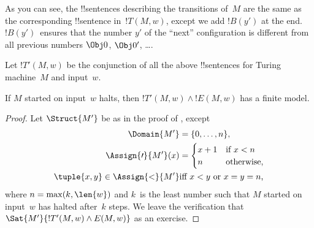 \documentclass[../../../include/open-logic-section]{subfiles}
\begin{document}
\begin{enumerate}
As you can see, the !!{sentence}s describing the transitions of~$M$ 
are the same as the corresponding !!{sentence}
in~$!T(M,w)$, except we add $!B(y')$ at the end. $!B(y')$~ensures
that the number $y'$ of the ``next'' configuration is different from
all previous numbers $\Obj 0$, $\Obj 0'$, \dots.
\end{enumerate}
Let $!T'(M, w)$ be the conjunction of all the above !!{sentence}s for Turing
machine~$M$ and input~$w$.

\begin{lem}
  If $M$ started on input~$w$ halts, then $!T'(M,w) \land !E(M,w)$ has
  a finite model.
\end{lem}

\begin{proof}
  Let $\Struct{M'}$ be as in the proof of
  , except
  \begin{align*}
    \Domain{M'} & = \{0, \dots, n\},\\
    \Assign{\prime}{M'}(x) & = 
    \begin{cases}
      x + 1 &\text{if $x < n$}\\
      n &\text{otherwise,}
    \end{cases} \\
    \tuple{x,y} \in \Assign{<}{M'} &\text{iff $x < y$ or $x = y = n$,}
  \end{align*}
  where $n = \max(k,\len{w})$ and $k$~is the least number such that
  $M$ started on input~$w$ has halted after~$k$ steps. We leave the
  verification that $\Sat{M'}{!T'(M,w) \land E(M,w)}$ as an exercise.
\end{proof}
\end{document}

